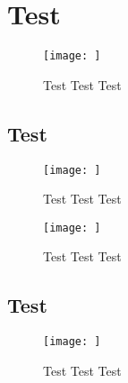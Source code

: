 \documentclass[11pt,a4paper,twoside,openany]{book}
\begin{document}
\chapter{Test}

\blindtext[2]

\begin{figure}
\centering
\texttt{[image: ]}
\caption{Test Test Test}
\end{figure}

\section{Test}

\blindtext[2]

\begin{figure}
\centering
\texttt{[image: ]}
\caption{Test Test Test}
\end{figure}

\blindtext[2]

\begin{figure}
\centering
\texttt{[image: ]}
\caption{Test Test Test}
\end{figure}

\section{Test}

\blindtext[2]

\begin{figure}
\centering
\texttt{[image: ]}
\caption{Test Test Test}
\end{figure}

\blindtext[2]
\end{document}
